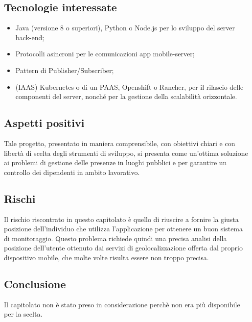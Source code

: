 \documentclass[../studio-di-fattibilita.tex]{subfiles}
\begin{document}
\subsection{Tecnologie interessate}%
\label{sub:tecnologie_interessate}
\begin{itemize}
  \item Java (versione 8 o superiori), Python o Node.js per lo sviluppo del server back-end;
  \item Protocolli asincroni per le comunicazioni app mobile-server;
  \item Pattern di Publisher/Subscriber;
  \item {} (IAAS) Kubernetes o di un PAAS, Openshift o Rancher, per il rilascio delle componenti del server, nonché per la gestione della scalabilità orizzontale.
\end{itemize}

\subsection{Aspetti positivi}%
\label{sub:aspetti_positivi}
Tale progetto, presentato in maniera comprensibile, con obiettivi chiari e con libertà di scelta degli strumenti di sviluppo, si presenta come un'ottima soluzione ai problemi di gestione delle presenze in luoghi pubblici  e per garantire un controllo dei dipendenti in ambito lavorativo.

\subsection{Rischi}%
\label{sub:rischi}
Il rischio riscontrato in questo capitolato è quello di riuscire a fornire la giusta posizione dell'individuo che utilizza l'applicazione per ottenere un buon sistema di monitoraggio. Questo problema richiede quindi una precisa analisi della posizione dell'utente ottenuto dai servizi di geolocalizzazione offerta dal proprio dispositivo mobile, che molte volte risulta essere non troppo precisa.

\subsection{Conclusione}%
\label{sub:conclusione}
Il capitolato non è stato preso in considerazione perchè non era più disponibile per la scelta.
\end{document}
